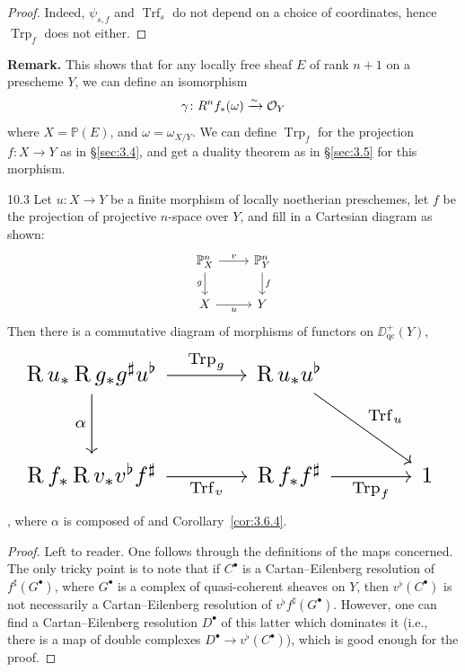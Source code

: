 \begin{proof}
Indeed, $\psi_{s,f}$ and $\operatorname{Trf}_s$ do not depend on a choice of coordinates, hence $\operatorname{Trp}_f$ does not either.
\end{proof}

\textbf{Remark.}
This shows that for any locally free sheaf $E$ of rank $n+1$ on a prescheme $Y$, we can define an isomorphism
\[
\gamma\colon R^n f_*(\omega) \xrightarrow{\sim} \mathcal{O}_Y
\]
where $X=\mathbb{P}(E)$, and $\omega=\omega_{X/Y}$. We can define $\operatorname{Trp}_f$ for the projection $f\colon X\to Y$ as in \S\ref{sec:3.4}, and get a duality theorem as in \S\ref{sec:3.5} for this morphism.

\begin{bookproposition}{10.3}\label{prop:3.10.3}
Let $u\colon X\to Y$ be a finite morphism of locally noetherian preschemes, let $f$ be the projection of projective $n$-space over $Y$, and fill in a Cartesian diagram as shown:
\[
\begin{tikzcd}
\mathbb{P}_X^n \arrow[r, "v"] \arrow[d, "g"'] & \mathbb{P}_Y^n \arrow[d, "f"] \\
X \arrow[r, "u"'] & Y
\end{tikzcd}
\]
Then there is a commutative diagram of morphisms of functors on $\DD_{\mathrm{qc}}^+(Y)$,
\[
\resizebox{\linewidth}{!}{\begin{tikzcd}[ampersand replacement=\&, row sep=large, column sep=large]
	\RR u_* \RR g_* g^\sharp u^\flat \arrow[r, "\operatorname{Trp}_g"] \arrow[d, "\alpha"']
	\& \RR u_* u^\flat \arrow[dr, "\operatorname{Trf}_u"] \& \\
	\RR f_* \RR v_* v^\flat f^\sharp \arrow[r, "\operatorname{Trf}_v"']
	\& \RR f_* f^\sharp \arrow[r, "\operatorname{Trp}_f"']
	\& 1~
\end{tikzcd}}
\],
where $\alpha$ is composed of  and Corollary~\ref{cor:3.6.4}.
\end{bookproposition}

\begin{proof}
Left to reader. One follows through the definitions of the maps concerned. The only tricky point is to note that if $C^\bullet$ is a Cartan--Eilenberg resolution of $f^{\sharp}(G^\bullet)$, where $G^\bullet$ is a complex of quasi-coherent sheaves on $Y$, then $v^{\flat}(C^\bullet)$ is not necessarily a Cartan--Eilenberg resolution of $v^{\flat}f^{\sharp}(G^\bullet)$. However, one can find a Cartan--Eilenberg resolution $D^\bullet$ of this latter which dominates it (i.e., there is a map of double complexes $D^\bullet\to v^{\flat}(C^\bullet)$), which is good enough for the proof.
\end{proof}

